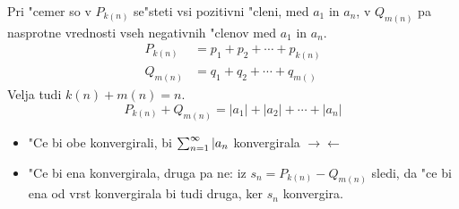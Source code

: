 Pri "cemer so v $P_{k(n)}$ se"steti vsi pozitivni "cleni, med $a_1$ in $a_n$, v $Q_{m(n)}$ pa nasprotne vrednosti vseh negativnih "clenov med $a_1$ in $a_n$.
\begin{align*}
P_{k(n)} &= p_1 + p_2 + \cdots + p_{k(n)} \\
Q_{m(n)} &= q_1 + q_2 + \cdots + q_{m()}
\end{align*}
Velja tudi $k(n) + m(n) = n$.
\begin{equation*}
P_{k(n)} + Q_{m(n)} = |a_1| + |a_2| + \cdots + |a_n|
\end{equation*}
\begin{itemize}
	\item "Ce bi obe konvergirali, bi $\sum_{n = 1}^{\infty}|a_n$ konvergirala $\rightarrow \leftarrow$
	\item "Ce bi ena konvergirala, druga pa ne: iz $s_n = P_{k(n)} - Q_{m(n)}$ sledi, da "ce bi ena od vrst konvergirala bi tudi druga, ker $s_n$ konvergira.
\end{itemize}